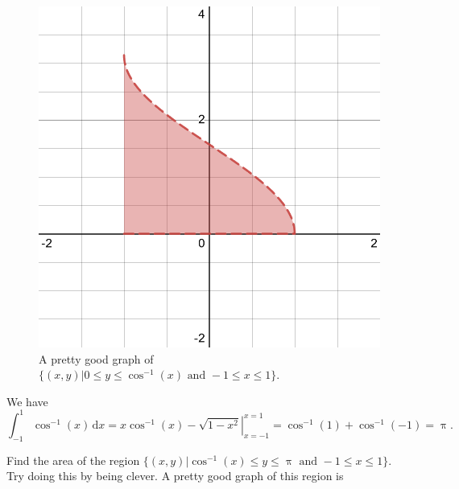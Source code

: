 \documentclass[12pt,fleqn,answers]{exam}
\begin{document}
\begin{questions}
\begin{figure}[h]
\begin{center}
\includegraphics[scale=0.15]{desmos-graph(58).png}
\end{center}
\caption{A pretty good graph of $\{(x,y) | 0 \leq y \leq \cos^{-1}(x) 
\mbox{ and }  -1 \leq x \leq 1 \}$.}
\end{figure}
\begin{solution}%

We have
\begin{equation*}
    \int_{-1}^1 \cos^{-1}(x) \, \mathrm{d} x = 
    \left.  x \cos^{-1}(x) -\sqrt{1-x^2} \right |_{x=-1}^{x=1}
    =\cos^{-1}(1) + \cos^{-1}(-1) = \uppi.
\end{equation*}
\end{solution}


\question [2] Find the area of the region $\{(x,y) | \cos^{-1}(x) \leq y 
\leq \uppi \mbox{ and }  -1 \leq x \leq 1 \}$. Try doing this by
being clever. A pretty good graph of this region is 


\end{questions}
\end{document}
